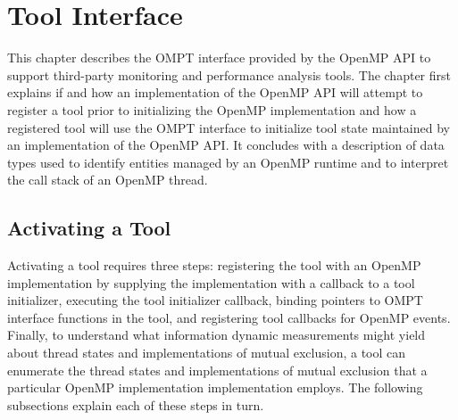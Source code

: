 %
%
%
%
%
%
%
%
%
%


\chapter{Tool Interface}
\label{chap:ToolsSupport}

This chapter describes the OMPT interface provided by the OpenMP API
to support third-party monitoring and performance analysis tools.
The chapter first explains if and how an implementation of
the OpenMP API will attempt to register a tool prior to initializing the 
OpenMP implementation and
how a registered tool will use the OMPT interface to initialize tool state maintained by
an implementation of the OpenMP API.
It concludes with a description of data types
used to identify entities managed by an OpenMP runtime and to interpret the
call stack of an OpenMP thread.

\section{Activating a Tool}
Activating a tool requires three steps: registering the tool with an OpenMP
implementation by supplying the implementation with a
callback to a tool initializer, executing the tool
initializer callback, binding pointers to OMPT interface functions 
in the tool, and registering tool callbacks for OpenMP events. 
Finally, to understand what information dynamic measurements might yield
about thread states and implementations of mutual exclusion, a tool can
enumerate the thread states and implementations of mutual exclusion 
that a particular OpenMP implementation implementation employs.
The following subsections explain each of these steps in turn.

